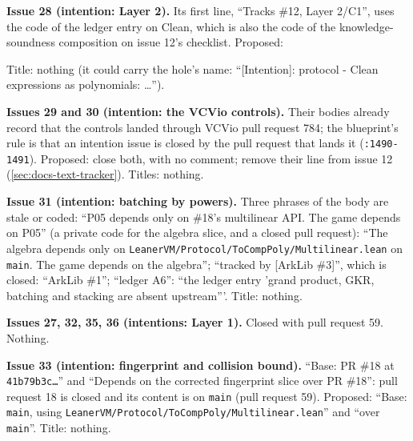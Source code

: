 \textbf{Issue 28 (intention: Layer 2).} Its first line, ``Tracks \#12, Layer 2/C1'', uses the code of the ledger entry on Clean, which is also the code of the knowledge-soundness composition on issue 12's checklist. Proposed:


Title: nothing (it could carry the hole's name: ``[Intention]: protocol - Clean expressions as polynomials: …'').

\begin{sloppypar}
\textbf{Issues 29 and 30 (intention: the VCVio controls).} Their bodies already record that the controls landed through VCVio pull request 784; the blueprint's rule is that an intention issue is closed by the pull request that lands it (\texttt{:\allowbreak{}1490-\allowbreak{}1491}). Proposed: close both, with no comment; remove their line from issue 12 (\cref{sec:docs-text-tracker}). Titles: nothing.
\end{sloppypar}

\begin{sloppypar}
\textbf{Issue 31 (intention: batching by powers).} Three phrases of the body are stale or coded: ``P05 depends only on \#18's multilinear API. The game depends on P05'' (a private code for the algebra slice, and a closed pull request): ``The algebra depends only on \texttt{Leaner\allowbreak{}VM/\allowbreak{}Protocol/\allowbreak{}To\allowbreak{}Comp\allowbreak{}Poly/\allowbreak{}Multilinear.\allowbreak{}lean} on \texttt{main}. The game depends on the algebra''; ``tracked by [ArkLib \#3]'', which is closed: ``ArkLib \#1''; ``ledger A6'': ``the ledger entry 'grand product, GKR, batching and stacking are absent upstream'''. Title: nothing.
\end{sloppypar}

\textbf{Issues 27, 32, 35, 36 (intentions: Layer 1).} Closed with pull request 59. Nothing.

\begin{sloppypar}
\textbf{Issue 33 (intention: fingerprint and collision bound).} ``Base: PR \#18 at \texttt{41b79b3c…}'' and ``Depends on the corrected fingerprint slice over PR \#18'': pull request 18 is closed and its content is on \texttt{main} (pull request 59). Proposed: ``Base: \texttt{main}, using \texttt{Leaner\allowbreak{}VM/\allowbreak{}Protocol/\allowbreak{}To\allowbreak{}Comp\allowbreak{}Poly/\allowbreak{}Multilinear.\allowbreak{}lean}'' and ``over \texttt{main}''. Title: nothing.
\end{sloppypar}

